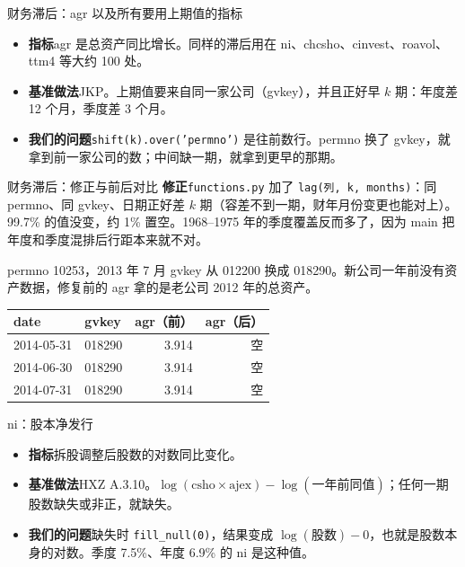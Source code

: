 \documentclass[UTF8,fontset=fandol,aspectratio=169,10pt,t]{ctexbeamer}
\newcommand{\chg}[1]{\textcolor{red!80!black}{#1}}
\newcommand{\kong}{空}
\newcommand{\code}[1]{\texttt{#1}}
\newcommand{\lab}[1]{\textbf{#1}\quad}
\newcommand{\tsize}{\small}
\newcommand{\src}[1]{{\footnotesize\color{black!60}#1}}
\begin{document}
\begin{frame}{财务滞后：agr 以及所有要用上期值的指标}
\begin{itemize}
\item \lab{指标}agr 是总资产同比增长。同样的滞后用在 ni、chcsho、cinvest、roavol、ttm4 等大约 100 处。
\item \lab{基准做法}JKP。上期值要来自同一家公司（gvkey），并且正好早 $k$ 期：年度差 12 个月，季度差 3 个月。
\item \lab{我们的问题}\code{shift(k).over('permno')} 是往前数行。permno 换了 gvkey，就拿到前一家公司的数；中间缺一期，就拿到更早的那期。
\end{itemize}
\end{frame}

\begin{frame}{财务滞后：修正与前后对比}
\lab{修正}\code{functions.py} 加了 \code{lag(列, k, months)}：同 permno、同 gvkey、日期正好差 $k$ 期（容差不到一期，财年月份变更也能对上）。99.7\% 的值没变，约 1\% 置空。1968--1975 年的季度覆盖反而多了，因为 main 把年度和季度混排后行距本来就不对。\par\medskip
\src{permno 10253，2013 年 7 月 gvkey 从 012200 换成 018290。新公司一年前没有资产数据，修复前的 agr 拿的是老公司 2012 年的总资产。}\par\smallskip
{\tsize
\begin{tabular}{l l rr}
\toprule
date & gvkey & agr（前） & agr（后） \\
\midrule
2014-05-31 & 018290 & 3.914 & \chg{\kong} \\
2014-06-30 & 018290 & 3.914 & \chg{\kong} \\
2014-07-31 & 018290 & 3.914 & \chg{\kong} \\
\bottomrule
\end{tabular}}
\end{frame}

\begin{frame}{ni：股本净发行}
\begin{itemize}
\item \lab{指标}拆股调整后股数的对数同比变化。
\item \lab{基准做法}HXZ A.3.10。$\log(\text{csho}\times\text{ajex})-\log(\text{一年前同值})$；任何一期股数缺失或非正，就缺失。
\item \lab{我们的问题}缺失时 \code{fill\_null(0)}，结果变成 $\log(\text{股数})-0$，也就是股数本身的对数。季度 7.5\%、年度 6.9\% 的 ni 是这种值。
\end{itemize}
\end{frame}
\end{document}
